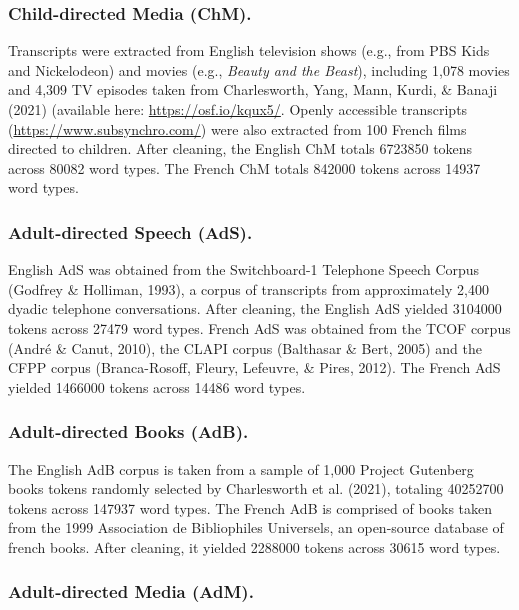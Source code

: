 \documentclass[10pt, letterpaper]{article}
\begin{document}
\hypertarget{child-directed-media-chm.}{%
\subsubsection{Child-directed Media
(ChM).}\label{child-directed-media-chm.}}

Transcripts were extracted from English television shows (e.g., from PBS
Kids and Nickelodeon) and movies (e.g., \emph{Beauty and the Beast}),
including 1,078 movies and 4,309 TV episodes taken from Charlesworth,
Yang, Mann, Kurdi, \& Banaji (2021) (available here:
\url{https://osf.io/kqux5/}. Openly accessible transcripts
(\url{https://www.subsynchro.com/}) were also extracted from 100 French
films directed to children. After cleaning, the English ChM totals
6723850 tokens across 80082 word types. The French ChM totals 842000
tokens across 14937 word types.

\hypertarget{adult-directed-speech-ads.}{%
\subsubsection{Adult-directed Speech
(AdS).}\label{adult-directed-speech-ads.}}

English AdS was obtained from the Switchboard-1 Telephone Speech Corpus
(Godfrey \& Holliman, 1993), a corpus of transcripts from approximately
2,400 dyadic telephone conversations. After cleaning, the English AdS
yielded 3104000 tokens across 27479 word types. French AdS was obtained
from the TCOF corpus (André \& Canut, 2010), the CLAPI corpus (Balthasar
\& Bert, 2005) and the CFPP corpus (Branca-Rosoff, Fleury, Lefeuvre, \&
Pires, 2012). The French AdS yielded 1466000 tokens across 14486 word
types.

\hypertarget{adult-directed-books-adb.}{%
\subsubsection{Adult-directed Books
(AdB).}\label{adult-directed-books-adb.}}

The English AdB corpus is taken from a sample of 1,000 Project Gutenberg
books tokens randomly selected by Charlesworth et al. (2021), totaling
40252700 tokens across 147937 word types. The French AdB is comprised of
books taken from the 1999 Association de Bibliophiles Universels, an
open-source database of french books. After cleaning, it yielded 2288000
tokens across 30615 word types.

\hypertarget{adult-directed-media-adm.}{%
\subsubsection{Adult-directed Media
(AdM).}\label{adult-directed-media-adm.}}
\end{document}

